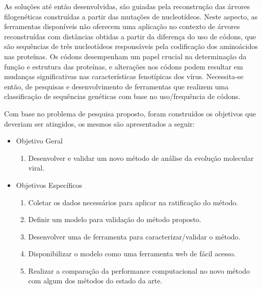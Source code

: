 As soluções até então desenvolvidas, são guiadas pela reconstrução das árvores filogenéticas construídas a partir das mutações de nucleotídeos. Neste aspecto, as ferramentas disponíveis não oferecem uma aplicação no contexto de árvores reconstruídas com distâncias obtidas a partir da diferença do uso de códons, que são sequências de três nucleotídeos responsáveis pela codificação dos aminoácidos nas proteínas. Os códons desempenham um papel crucial na determinação da função e estrutura das proteínas, e alterações nos códons podem resultar em mudanças significativas nas características fenotípicas dos vírus. Necessita-se então, de pesquisas e desenvolvimento de ferramentas que realizem uma classificação de sequências genéticas com base no uso/frequência de códons.


Com base no problema de pesquisa proposto, foram construídos os objetivos que deveriam ser atingidos, os mesmos são apresentados a seguir:
\begin{itemize}
  \item Objetivo Geral
        \begin{enumerate}[label=~(\roman*)]
          \item Desenvolver e validar um novo método de análise da evolução molecular viral.
        \end{enumerate}
  \item Objetivos Específicos
        \begin{enumerate}[label=~(\roman*)]
          \item Coletar os dados necessários para aplicar na ratificação do método.
          \item Definir um modelo para validação do método proposto.
          \item Desenvolver uma de ferramenta para caracterizar/validar o método.
          \item Disponibilizar o modelo como uma ferramenta web de fácil acesso.
          \item Realizar a comparação da performance computacional no novo método com algum dos métodos do estado da arte.
        \end{enumerate}
\end{itemize}

